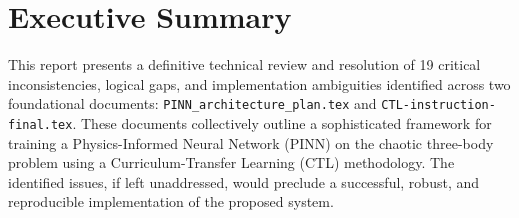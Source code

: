 \section*{Executive Summary}
This report presents a definitive technical review and resolution of 19 critical inconsistencies, logical gaps, and implementation ambiguities identified across two foundational documents: \texttt{PINN\_architecture\_plan.tex} and \texttt{CTL-instruction-final.tex}. These documents collectively outline a sophisticated framework for training a Physics-Informed Neural Network (PINN) on the chaotic three-body problem using a Curriculum-Transfer Learning (CTL) methodology. The identified issues, if left unaddressed, would preclude a successful, robust, and reproducible implementation of the proposed system.


